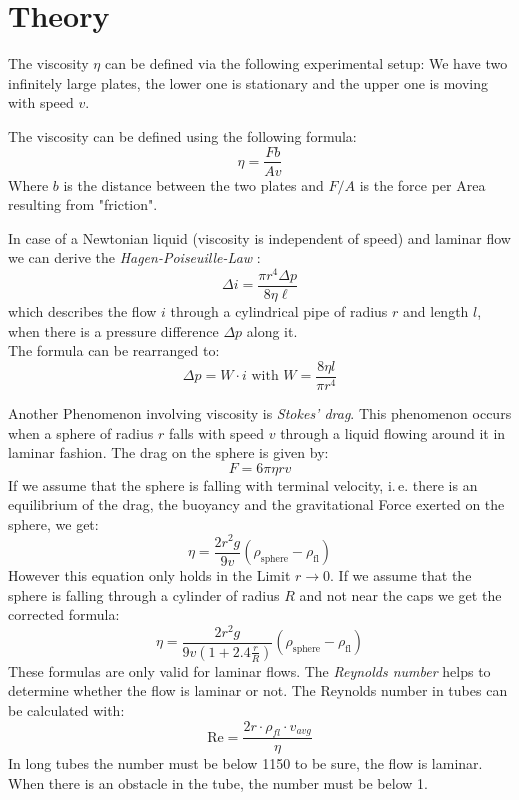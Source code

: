 \section{Theory}

The viscosity $\eta$ can be defined via the following experimental setup: We have two infinitely large plates, the lower one is stationary and the upper one is moving with speed $v$.

The viscosity can be defined using the following formula:
\begin{equation}
    \eta = \frac{F b}{A v} \label{eq:vis}
\end{equation}
Where $b$ is the distance between the two plates and $F/A$ is the force per Area resulting from "friction".

In case of a Newtonian liquid (viscosity is independent of speed) and laminar flow  we can derive the \emph{Hagen-Poiseuille-Law} :
\begin{equation}
   \Delta i = \frac{\pi r^4 \Delta p}{8 \eta \ell} \label{eq:hp}
\end{equation}
which describes the flow $i$ through a cylindrical pipe of radius $r$ and length $l$, when there is a pressure difference $\Delta p$ along it.\\
The formula can be rearranged to:
\begin{equation}
\Delta p = W \cdot i \text{ with } W = \frac{8\eta l}{\pi r^4}
\label{eq:pressure}
\end{equation}


Another Phenomenon involving viscosity is \emph{Stokes' drag}. This phenomenon occurs when a sphere of radius $r$ falls with speed $v$ through a liquid flowing around it in laminar fashion. The drag on the sphere is given by:
\begin{equation}
    F = 6 \pi \eta r v \label{eq:stokes}
\end{equation}
If we assume that the sphere is falling with terminal velocity, i.\,e. there is an equilibrium of the drag, the buoyancy and the gravitational Force exerted on the sphere, we get:
\begin{equation}
    \eta = \frac{2 r^2 g}{9 v}(\rho_\mathrm{sphere} - \rho_\mathrm{fl}) \label{eq:termid}
\end{equation}
However this equation only holds in the Limit $r \to 0$. 
If we assume that the sphere is falling through a cylinder of radius $R$ and not near the caps we get the corrected formula:
\begin{equation}
    \eta = \frac{2 r^2 g}{9 v \left( 1 + 2.4 \frac{r}{R} \right)}(\rho_\mathrm{sphere} - \rho_\mathrm{fl}) \label{eq:term}
\end{equation}
These formulas are only valid for laminar flows. The \emph{Reynolds number} helps to determine whether the flow is laminar or not. The Reynolds number in tubes can be calculated with:
\begin{equation}
\text{Re} = \frac{2r\cdot \rho_ {fl} \cdot v_{avg}}{\eta}
\label{eq:reynold}
\end{equation}
In long tubes the number must be below 1150 to be sure, the flow is laminar. When there is an obstacle in the tube, the number must be below 1.




